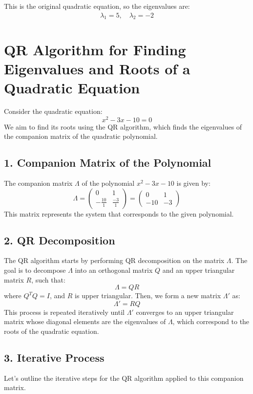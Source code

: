 \documentclass[journal]{IEEEtran}
\begin{document}
This is the original quadratic equation, so the eigenvalues are:
\begin{align}
    \lambda_1 = 5, \quad \lambda_2 = -2
\end{align}
\section*{QR Algorithm for Finding Eigenvalues and Roots of a Quadratic Equation}

Consider the quadratic equation:
\[
x^2 - 3x - 10 = 0
\]
We aim to find its roots using the QR algorithm, which finds the eigenvalues of the companion matrix of the quadratic polynomial.

\subsection*{1. Companion Matrix of the Polynomial}
The companion matrix \( \Lambda \) of the polynomial \( x^2 - 3x - 10 \) is given by:
\[
\Lambda = \begin{pmatrix} 
0 & 1 \\
-\frac{10}{1} & \frac{-3}{1}
\end{pmatrix}
= \begin{pmatrix}
0 & 1 \\
-10 & -3
\end{pmatrix}
\]
This matrix represents the system that corresponds to the given polynomial.

\subsection*{2. QR Decomposition}
The QR algorithm starts by performing QR decomposition on the matrix \( \Lambda \). The goal is to decompose \( \Lambda \) into an orthogonal matrix \( Q \) and an upper triangular matrix \( R \), such that:
\[
\Lambda = QR
\]
where \( Q^T Q = I \), and \( R \) is upper triangular. Then, we form a new matrix \( \Lambda' \) as:
\[
\Lambda' = RQ
\]
This process is repeated iteratively until \( \Lambda' \) converges to an upper triangular matrix whose diagonal elements are the eigenvalues of \( \Lambda \), which correspond to the roots of the quadratic equation.

\subsection*{3. Iterative Process}
Let’s outline the iterative steps for the QR algorithm applied to this companion matrix.
\end{document}
